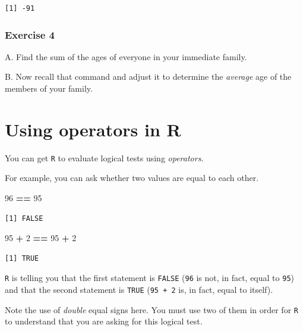 \documentclass[
]{book}
\newenvironment{Shaded}{\begin{snugshade}}{\end{snugshade}}
\newcommand{\DecValTok}[1]{\textcolor[rgb]{0.00,0.00,0.81}{#1}}
\newcommand{\OperatorTok}[1]{\textcolor[rgb]{0.81,0.36,0.00}{\textbf{#1}}}
\newcommand{\StringTok}[1]{\textcolor[rgb]{0.31,0.60,0.02}{#1}}
\begin{document}
\begin{verbatim}
[1] -91
\end{verbatim}

\hypertarget{exercise-4}{%
\subsubsection*{Exercise 4}\label{exercise-4}}

A. Find the sum of the ages of everyone in your immediate family.

B. Now recall that command and adjust it to determine the \emph{average} age of the members of your family.

\hypertarget{using-operators-in-r}{%
\section{Using operators in R}\label{using-operators-in-r}}

You can get \texttt{R} to evaluate logical tests using \emph{operators}.

For example, you can ask whether two values are equal to each other.

\begin{Shaded}
\begin{Highlighting}[]
\DecValTok{96} \OperatorTok{==}\StringTok{ }\DecValTok{95}
\end{Highlighting}
\end{Shaded}

\begin{verbatim}
[1] FALSE
\end{verbatim}

\begin{Shaded}
\begin{Highlighting}[]
\DecValTok{95} \OperatorTok{+}\StringTok{ }\DecValTok{2} \OperatorTok{==}\StringTok{ }\DecValTok{95} \OperatorTok{+}\StringTok{ }\DecValTok{2}
\end{Highlighting}
\end{Shaded}

\begin{verbatim}
[1] TRUE
\end{verbatim}

\texttt{R} is telling you that the first statement is \texttt{FALSE} (\texttt{96} is not, in fact, equal to \texttt{95}) and that the second statement is \texttt{TRUE} (\texttt{95\ +\ 2} is, in fact, equal to itself).

Note the use of \emph{double} equal signs here. You must use two of them in order for \texttt{R} to understand that you are asking for this logical test.
\end{document}
